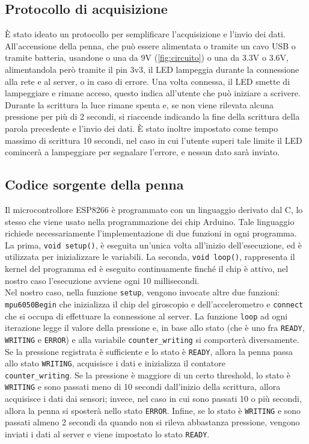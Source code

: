 \documentclass[8pt,notitlepage]{report}
\begin{document}
		\subsection{Protocollo di acquisizione}
			È stato ideato un protocollo per semplificare l'acquisizione e l'invio dei dati. All'accensione della penna, che può essere alimentata o tramite un cavo USB o tramite batteria, usandone o una da 9V (\cref{fig:circuito}) o una da 3.3V o 3.6V, alimentandola però tramite il pin 3v3, il LED lampeggia durante la connessione alla rete e al server, o in caso di errore. Una volta connessa, il LED smette di lampeggiare e rimane acceso, questo indica all'utente che può iniziare a scrivere. Durante la scrittura la luce rimane spenta e, se non viene rilevata alcuna pressione per più di 2 secondi, si riaccende indicando la fine della scrittura della parola precedente e l'invio dei dati. È stato inoltre impostato come tempo massimo di scrittura 10 secondi, nel caso in cui l'utente superi tale limite il LED comincerà a lampeggiare per segnalare l'errore, e nessun dato sarà inviato.
		
		\subsection{Codice sorgente della penna}
			Il microcontrollore ESP8266 è programmato con un linguaggio derivato dal C, lo stesso che viene usato nella programmazione dei chip Arduino. Tale linguaggio richiede necessariamente l'implementazione di due funzioni in ogni programma. \\
			La prima, \verb|void setup()|, è eseguita un'unica volta all'inizio dell'esecuzione, ed è utilizzata per inizializzare le variabili. La seconda, \verb|void loop()|, rappresenta il kernel del programma ed è eseguito continuamente finché il chip è attivo, nel nostro caso l'esecuzione avviene ogni 10 millisecondi. \\
			Nel nostro caso, nella funzione \verb|setup|, vengono invocate altre due funzioni: \verb|mpu6050Begin| che inizializza il chip del giroscopio e dell'accelerometro e \verb|connect| che si occupa di effettuare la connessione al server. La funzione \verb|loop| ad ogni iterazione legge il valore della pressione e, in base allo stato (che è uno fra \verb|READY|, \verb|WRITING| e \verb|ERROR|) e alla variabile \verb|counter_writing| si comporterà diversamente. \\ Se la pressione registrata è sufficiente e lo stato è \verb|READY|, allora la penna passa allo stato \verb|WRITING|, acquisisce i dati e inizializza il contatore \\ \verb|counter_writing|. Se la pressione è maggiore di un certo threshold, lo stato è \verb|WRITING| e sono passati meno di 10 secondi dall'inizio della scrittura, allora acquisisce i dati dai sensori; invece, nel caso in cui sono passati 10 o più secondi, allora la penna si sposterà nello stato \verb|ERROR|. Infine, se lo stato è \verb|WRITING| e sono passati almeno 2 secondi da quando non si rileva abbastanza pressione, vengono inviati i dati al server e viene impostato lo stato \verb|READY|. 
			
\end{document}
